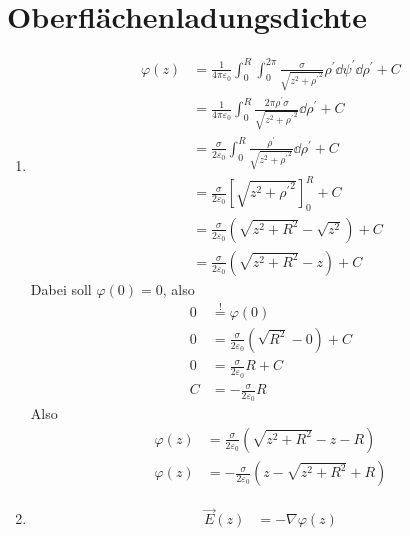 \documentclass[sectionformat=aufgabe]{gadsescript}
\begin{document}
\maketitle

\section{Oberflächenladungsdichte}
\begin{enumerate}[label=\alph*)]
	\item 
		\begin{align*}
			\varphi(z) &= \frac{ 1 }{ 4 \pi \varepsilon _0 } \int_{0} ^{R} \int_{0}^{2 \pi } \frac{ \sigma }{ \sqrt{z^2 +{ \rho^\prime} ^2}  } \rho^\prime \dd \psi^\prime  \dd \rho^\prime + C \\
			&= \frac{ 1 }{ 4 \pi \varepsilon _0 } \int_{0} ^{R} \frac{ 2 \pi \rho^\prime \sigma }{ \sqrt{z^2 +{ \rho^\prime} ^2}  } \dd \rho^\prime + C \\
			&= \frac{ \sigma }{ 2 \varepsilon _0 } \int_{0} ^{R} \frac{ \rho^\prime  }{ \sqrt{z^2 +{ \rho^\prime} ^2}  } \dd \rho^\prime + C \\
			&= \frac{ \sigma }{ 2 \varepsilon _0 } \left[ \sqrt{z^2 +{ \rho^\prime} ^2} \right]_{0} ^{R} + C \\
			&= \frac{ \sigma }{ 2 \varepsilon _0 } \left( \sqrt{z^2 + R^2} - \sqrt{z^2}  \right) + C \\
			&= \frac{ \sigma }{ 2 \varepsilon _0 } \left( \sqrt{z^2 + R^2} - z \right) + C
		\end{align*}
		Dabei soll $ \varphi(0) = 0 $, also
		\begin{align*}
			0 &\overset{!}{=} \varphi(0) \\
			0 &= \frac{ \sigma }{ 2 \varepsilon _0 } \left( \sqrt{R^2} - 0 \right) + C \\
			0 &= \frac{ \sigma }{ 2 \varepsilon _0 } R + C \\
			C &= - \frac{ \sigma }{ 2 \varepsilon _0 } R
		\end{align*}
		Also
		\begin{align*}
			\varphi(z) &= \frac{ \sigma }{ 2 \varepsilon _0 } \left( \sqrt{z^2 + R^2} - z - R \right)  \\
			\varphi(z) &= -\frac{ \sigma }{ 2 \varepsilon _0 } \left( z - \sqrt{z^2 + R^2} + R \right)
		\end{align*}
	\item 
		\begin{align*}
			\vec E(z) &= - \nabla \varphi(z) \\

\end{align*}
\end{enumerate}
\end{document}
